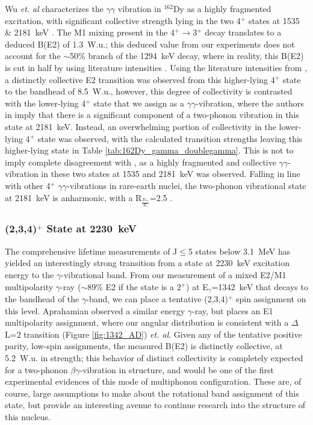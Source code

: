 Wu \textit{et. al} characterizes the $\gamma\gamma$ vibration in $^{162}$Dy as a highly fragmented excitation, with significant collective strength lying in the two 4$^+$ states at 1535 \& 2181~keV \cite{Wu_2minus_2001}. The M1 mixing present in the 4$^+\rightarrow$3$^+$ decay translates to a deduced B(E2) of 1.3~W.u.; this deduced value from our experiments does not account for the $\sim$50\% branch of the 1294~keV decay, where in reality, this B(E2) is cut in half by using literature intensities \cite{BERZINS1995413,Wu_2minus_2001}. Using the literature intensities from \cite{Wu_2minus_2001}, a distinctly collective E2 transition was observed from this higher-lying 4$^+$ state to the bandhead of 8.5~W.u., however, this degree of collectivity is contrasted with the lower-lying 4$^+$ state that we assign as a $\gamma\gamma$-vibration, where the authors in \cite{Wu_2minus_2001} imply that there is a significant component of a two-phonon vibration in this state at 2181~keV. Instead, an overwhelming portion of collectivity in the lower-lying 4$^+$ state was observed, with the calculated transition strengths leaving this higher-lying state in Table \ref{tab:162Dy_gamma_doublegamma}. This is not to imply complete disagreement with \cite{Wu_2minus_2001}, as a highly fragmented and collective $\gamma\gamma$-vibration in these two states at 1535 and 2181~keV was observed. Falling in line with other 4$^+$ $\gamma\gamma$-vibrations in rare-earth nuclei, the two-phonon vibrational state at 2181~keV is anharmonic, with a R$_{\frac{E_{\gamma\gamma}}{E_\gamma}}$=2.5 \cite{Garrett_twogammaEr_1997}.

\subsubsection{(2,3,4)$^+$ State at 2230~keV}
The comprehensive lifetime measurements of J$\leq$5 states below 3.1~MeV has yielded an interestingly strong transition from a state at 2230~keV excitation energy to the $\gamma$-vibrational band. From our measurement of a mixed E2/M1 multipolarity $\gamma$-ray ($\sim$89\% E2 if the state is a 2$^+$) at E$_\gamma$=1342~keV that decays to the bandhead of the $\gamma$-band, we can place a tentative (2,3,4)$^+$ spin assignment on this level. Aprahamian observed a similar energy $\gamma$-ray, but places an E1 multipolarity assignment, where our angular distribution is consistent with a $\Delta$L=2 transition (Figure \ref{fig:1342_AD}) \cite{Aprahamian200642} \textit{et. al}. Given any of the tentative positive parity, low-spin assignments, the measured B(E2) is distinctly collective, at 5.2~W.u. in strength; this behavior of distinct collectivity is completely expected for a two-phonon $\beta\gamma$-vibration in structure, and would be one of the first experimental evidences of this mode of multiphonon configuration. These are, of course, large assumptions to make about the rotational band assignment of this state, but provide an interesting avenue to continue research into the structure of this nucleus.

